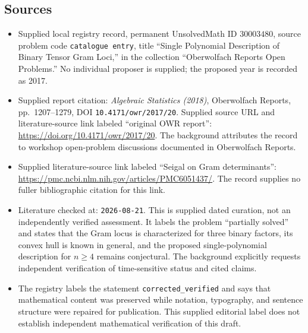 \documentclass[11pt]{article}
\begin{document}
\subsection{Sources}
\begin{itemize}
\item Supplied local registry record, permanent UnsolvedMath ID \(30003480\), source problem code \texttt{catalogue entry}, title ``Single Polynomial Description of Binary Tensor Gram Loci,'' in the collection ``Oberwolfach Reports Open Problems.'' No individual proposer is supplied; the proposed year is recorded as 2017.
\item Supplied report citation: \emph{Algebraic Statistics (2018)}, Oberwolfach Reports, pp.\ 1207--1279, DOI \texttt{10.4171/owr/2017/20}. Supplied source URL and literature-source link labeled ``original OWR report'': \url{https://doi.org/10.4171/owr/2017/20}. The background attributes the record to workshop open-problem discussions documented in Oberwolfach Reports.
\item Supplied literature-source link labeled ``Seigal on Gram determinants'': \url{https://pmc.ncbi.nlm.nih.gov/articles/PMC6051437/}. The record supplies no fuller bibliographic citation for this link.
\item Literature checked at: \texttt{2026-08-21}. This is supplied dated curation, not an independently verified assessment. It labels the problem ``partially solved'' and states that the Gram locus is characterized for three binary factors, its convex hull is known in general, and the proposed single-polynomial description for \(n\geq4\) remains conjectural. The background explicitly requests independent verification of time-sensitive status and cited claims.
\item The registry labels the statement \texttt{corrected\_verified} and says that mathematical content was preserved while notation, typography, and sentence structure were repaired for publication. This supplied editorial label does not establish independent mathematical verification of this draft.
\end{itemize}
\end{document}
